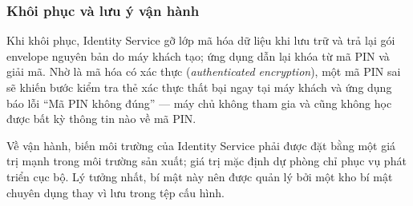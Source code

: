 \subsubsection{Khôi phục và lưu ý vận hành}

Khi khôi phục, Identity Service gỡ lớp mã hóa dữ liệu khi lưu trữ và trả lại gói envelope nguyên bản do máy khách tạo; ứng dụng dẫn lại khóa từ mã PIN và giải mã. Nhờ  là mã hóa có xác thực (\textit{authenticated encryption}), một mã PIN sai sẽ khiến bước kiểm tra thẻ xác thực thất bại ngay tại máy khách và ứng dụng báo lỗi ``Mã PIN không đúng'' — máy chủ không tham gia và cũng không học được bất kỳ thông tin nào về mã PIN.

Về vận hành, biến môi trường  của Identity Service phải được đặt bằng một giá trị mạnh trong môi trường sản xuất; giá trị mặc định dự phòng chỉ phục vụ phát triển cục bộ. Lý tưởng nhất, bí mật này nên được quản lý bởi một kho bí mật chuyên dụng thay vì lưu trong tệp cấu hình.
